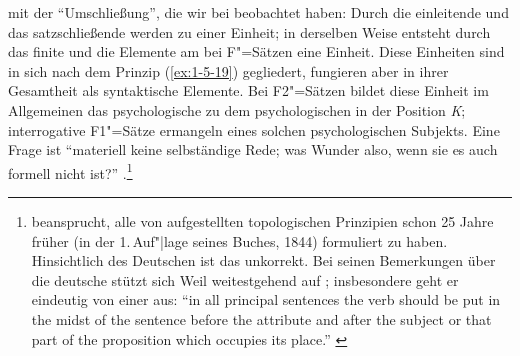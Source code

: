 \documentclass[output=paper]{langsci/langscibook}
\begin{document}
mit der "`Umschließung"', die wir bei \citet{Nordmeyer1883} beobachtet haben: Durch die
einleitende  und das satzschließende  werden  zu einer
Einheit; in derselben Weise entsteht durch das finite  und die Elemente am
 bei F"=Sätzen eine Einheit. Diese Einheiten sind in sich nach dem Prinzip
(\ref{ex:1-5-19}) gegliedert, fungieren aber in ihrer Gesamtheit als syntaktische Elemente. Bei F2"=Sätzen bildet diese Einheit im Allgemeinen das psychologische  zu dem psychologischen
 in der Position \textit{K}; interrogative F1"=Sätze ermangeln eines solchen psychologischen
Subjekts. Eine Frage ist "`materiell keine selbständige Rede; was Wunder also, wenn sie es auch
formell nicht ist?"' \citep[156]{Gabelentz1875}.\footnote{%
  \citet[9]{Weil1879} beansprucht, alle von \citet{Gabelentz1875} aufgestellten topologischen Prinzipien schon
  25 Jahre früher (in der 1.\,Auf"|lage seines Buches, 1844) formuliert zu haben. Hinsichtlich des Deutschen ist das unkorrekt. Bei seinen Bemerkungen über die deutsche  stützt sich Weil weitestgehend auf \citet{Herling1830}; insbesondere geht er eindeutig von einer  aus:
  "`in all principal sentences the verb should be put in the midst of the sentence before the attribute
  and after the subject or that part of the proposition which occupies its place."'
  \citep[54]{Weil1879}%
}
\end{document}
